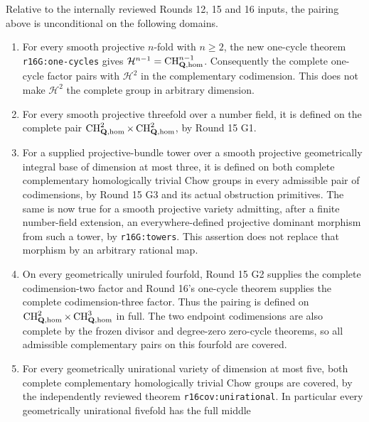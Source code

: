 \begin{corollary}
\label{r16h:domains}
Relative to the internally reviewed Rounds 12, 15 and 16 inputs, the pairing above is
unconditional on the following domains.
\begin{enumerate}
\item For every smooth projective $n$-fold with $n\geq2$, the new
      one-cycle theorem \texttt{r16G:one-cycles} gives
      $\mathcal H^{n-1}=\operatorname{CH}^{n-1}_{\mathbf Q,\rm hom}$.
      Consequently the complete one-cycle factor pairs with
      $\mathcal H^2$ in the complementary codimension. This does not
      make $\mathcal H^2$ the complete group in arbitrary dimension.
\item For every smooth projective threefold over a number field, it
      is defined on the complete pair
      $\operatorname{CH}^2_{\mathbf Q,\rm hom}\times
       \operatorname{CH}^2_{\mathbf Q,\rm hom}$, by Round 15 G1.
\item For a supplied projective-bundle tower over a smooth projective
      geometrically integral base of dimension at most three, it is
      defined on both complete complementary homologically trivial
      Chow groups in every admissible pair of codimensions, by
      Round 15 G3 and its actual obstruction primitives. The same is
      now true for a smooth projective variety admitting, after a
      finite number-field extension, an everywhere-defined projective
      dominant morphism from such a tower, by
      \texttt{r16G:towers}. This assertion does not replace that
      morphism by an arbitrary rational map.
\item On every geometrically uniruled fourfold, Round 15 G2 supplies
      the complete codimension-two factor and Round 16's one-cycle
      theorem supplies the complete codimension-three factor. Thus
      the pairing is defined on
      $\operatorname{CH}^2_{\mathbf Q,\rm hom}\times
       \operatorname{CH}^3_{\mathbf Q,\rm hom}$ in full. The two
      endpoint codimensions are also complete by the frozen divisor
      and degree-zero zero-cycle theorems, so all admissible
      complementary pairs on this fourfold are covered.
\item For every geometrically unirational variety of dimension at
      most five, both complete complementary homologically trivial
      Chow groups are covered, by the independently reviewed
      theorem \texttt{r16cov:unirational}. In particular every
      geometrically unirational fivefold has the full middle

\end{enumerate}
\end{corollary}

